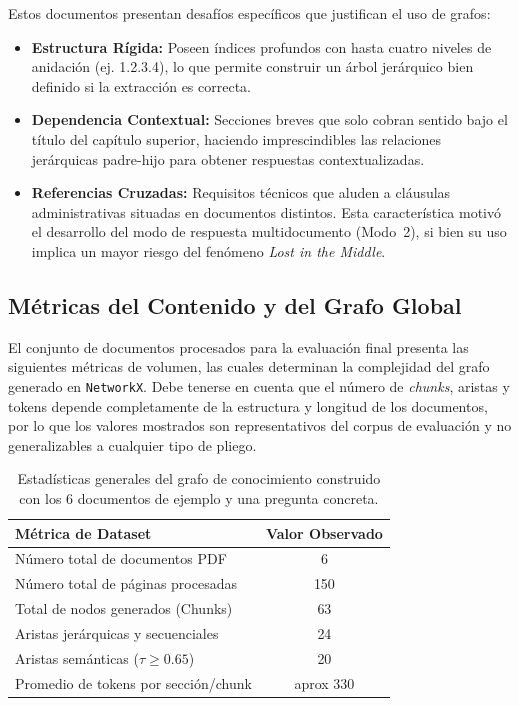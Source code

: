 Estos documentos presentan desafíos específicos que justifican el uso de grafos:
\begin{itemize}
    \item \textbf{Estructura Rígida:} Poseen índices profundos con hasta cuatro niveles de anidación (ej. 1.2.3.4), lo que permite construir un árbol jerárquico bien definido si la extracción es correcta.
    \item \textbf{Dependencia Contextual:} Secciones breves que solo cobran sentido bajo el título del capítulo superior, haciendo imprescindibles las relaciones jerárquicas padre-hijo para obtener respuestas contextualizadas.
    \item \textbf{Referencias Cruzadas:} Requisitos técnicos que aluden a cláusulas administrativas situadas en documentos distintos. Esta característica motivó el desarrollo del modo de respuesta multidocumento (Modo~2), si bien su uso implica un mayor riesgo del fenómeno \textit{Lost in the Middle}.
\end{itemize}

\subsection{Métricas del Contenido y del Grafo Global}
El conjunto de documentos procesados para la evaluación final presenta las siguientes métricas de volumen, las cuales determinan la complejidad del grafo generado en \texttt{NetworkX}. Debe tenerse en cuenta que el número de \textit{chunks}, aristas y tokens depende completamente de la estructura y longitud de los documentos, por lo que los valores mostrados son representativos del corpus de evaluación y no generalizables a cualquier tipo de pliego.
\begin{table}[ht]
\centering
\begin{tabular}{|l|c|}
\hline
\textbf{Métrica de Dataset} & \textbf{Valor Observado} \\ \hline
Número total de documentos PDF & 6 \\ \hline
Número total de páginas procesadas & 150 \\ \hline
Total de nodos generados (Chunks) & 63 \\ \hline
Aristas jerárquicas y secuenciales & 24 \\ \hline
Aristas semánticas ($\tau \geq 0.65$) & 20 \\ \hline
Promedio de tokens por sección/chunk & aprox 330 \\ \hline
\end{tabular}
\caption{Estadísticas generales del grafo de conocimiento construido con los 6 documentos de ejemplo y una pregunta concreta.}
\label{tab:metricas_dataset}
\end{table}

